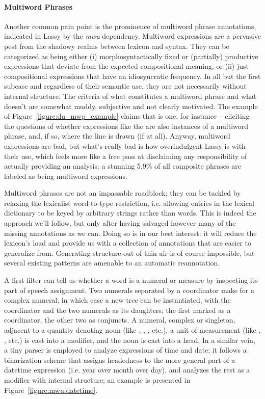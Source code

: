 \paragraph{Multiword Phrases}
Another common pain point is the prominence of multiword phrase annotations, indicated in Lassy by the \textit{mwu} dependency.
Multiword expressions are a pervasive pest from the shadowy realms between lexicon and syntax.
They can be categorized as being either (i) morphosyntactically fixed or (partially) productive expressions that deviate from the expected compositional meaning, or (ii) just compositional expressions that have an idiosyncratic frequency.
In all but the first subcase and regardless of their semantic use, they are not necessarily without internal structure.
The criteria of what constitutes a multiword phrase and what doesn't are somewhat muddy, subjective and not clearly motivated.
The example of Figure~\ref{figure:du_mwp_example} claims that  is one, for instance -- eliciting the questions of whether expressions like the  are also instances of a multiword phrase, and, if so, where the line is drawn (if at all).
Anyway, multiword expressions are bad, but what's really bad is how overindulgent Lassy is with their use, which feels more like a free pass at disclaiming any responsibility of actually providing an analysis: a stunning 5.9\% of all composite phrases are labeled as being multiword expressions.

Multiword phrases are not an impassable roadblock; they can be tackled by relaxing the lexicalist word-to-type restriction, i.e. allowing entries in the lexical dictionary to be keyed by arbitrary strings rather than words.
This is indeed the approach we'll follow, but only after having salvaged however many of the missing annotations as we can.
Doing so is in our best interest: it will reduce the lexicon's load and provide us with a collection of annotations that are easier to generalize from.
Generating structure out of thin air is of course impossible, but several existing patterns are amenable to an automatic reannotation.

A first filter can tell us whether a word is a numeral or measure by inspecting its part of speech assignment.
Two numerals separated by a coordinator make for a complex numeral, in which case a new tree can be instantiated, with the coordinator and the two numerals as its daughters; the first marked as a coordinator, the other two as conjuncts.
A numeral, complex or singleton, adjacent to a quantity denoting noun (like , , , etc.), a unit of measurement (like , , etc.) is cast into a modifier, and the noun is cast into a head.
In a similar vein, a tiny parser is employed to analyze expressions of time and date; it follows a binarization scheme that assigns headedness to the more general part of a datetime expression (i.e. year over month over day), and analyzes the rest as a modifier with internal structure; an example is presented in Figure~\ref{figure:mwu:datetime}.

